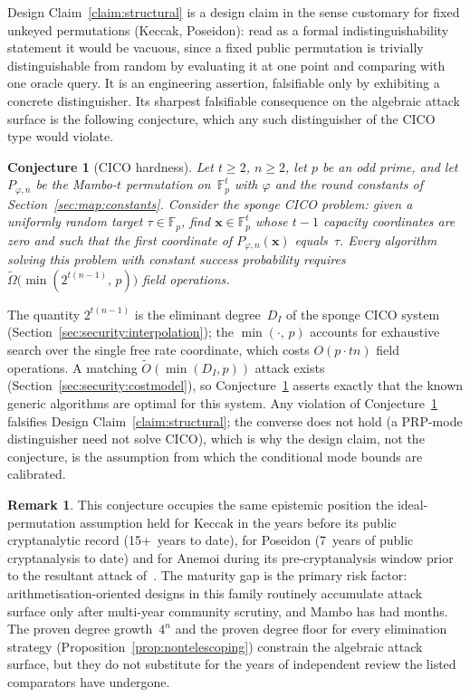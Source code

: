 \documentclass[11pt,a4paper]{article}
\newtheorem{conjecture}[theorem]{Conjecture}
\theoremstyle{definition}
\newtheorem{remark}[theorem]{Remark}
\newcommand{\Fp}{\mathbb{F}_p}
\begin{document}
Design Claim~\ref{claim:structural} is a design claim in the sense
customary for fixed unkeyed permutations (Keccak, Poseidon): read as a
formal indistinguishability statement it would be vacuous, since a
fixed public permutation is trivially distinguishable from random by
evaluating it at one point and comparing with one oracle query. It is
an engineering assertion, falsifiable only by exhibiting a concrete
distinguisher. Its sharpest falsifiable consequence on the algebraic
attack surface is the following conjecture, which any such
distinguisher of the CICO type would violate.

\begin{conjecture}[CICO hardness]\label{conj:cico}
Let $t \ge 2$, $n \ge 2$, let $p$ be an odd prime, and let
$P_{\varphi,n}$ be the Mambo-$t$ permutation on~$\Fp^t$ with
$\varphi$ and the round constants of
Section~\ref{sec:map:constants}. Consider the sponge CICO problem:
given a uniformly random target $\tau \in \Fp$, find
$\mathbf{x} \in \Fp^t$ whose $t-1$ capacity coordinates are zero and
such that the first coordinate of $P_{\varphi,n}(\mathbf{x})$
equals~$\tau$. Every algorithm solving this problem with constant
success probability requires
$\widetilde{\Omega}\bigl(\min(2^{t(n-1)},\, p)\bigr)$ field
operations.
\end{conjecture}

The quantity $2^{t(n-1)}$ is the eliminant degree~$D_I$ of the sponge
CICO system (Section~\ref{sec:security:interpolation}); the
$\min(\cdot,\, p)$ accounts for exhaustive search over the single free
rate coordinate, which costs $O(p \cdot tn)$ field operations. A
matching $\widetilde{O}(\min(D_I, p))$ attack exists
(Section~\ref{sec:security:costmodel}), so
Conjecture~\ref{conj:cico} asserts exactly that the known generic
algorithms are optimal for this system. Any violation of
Conjecture~\ref{conj:cico} falsifies
Design Claim~\ref{claim:structural}; the converse does not hold
(a PRP-mode distinguisher need not solve CICO), which is why the
design claim, not the conjecture, is the assumption from which the
conditional mode bounds are calibrated.

\begin{remark}\label{rem:maturity}
This conjecture occupies the same epistemic position the
ideal-permutation assumption held for Keccak in the years before its
public cryptanalytic record (15+~years to date), for Poseidon (7~years
of public cryptanalysis to date) and for Anemoi during its
pre-cryptanalysis window prior to the resultant attack
of~\cite{Anemoi_attack}. The maturity gap is the primary risk factor:
arithmetisation-oriented designs in this family routinely accumulate
attack surface only after multi-year community scrutiny, and Mambo
has had months. The proven degree growth~$4^n$ and the proven degree floor for every
elimination strategy (Proposition~\ref{prop:nontelescoping}) constrain
the algebraic attack surface, but they do not substitute for the
years of independent review the listed comparators have undergone.
\end{remark}
\end{document}
